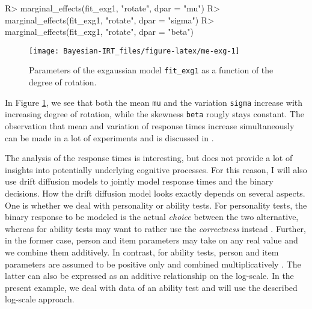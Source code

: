 \documentclass[jss]{jss}
\begin{document}
\begin{CodeChunk}

\begin{CodeInput}
R> marginal_effects(fit_exg1, "rotate", dpar = "mu")
R> marginal_effects(fit_exg1, "rotate", dpar = "sigma")
R> marginal_effects(fit_exg1, "rotate", dpar = "beta")
\end{CodeInput}
\end{CodeChunk}

\begin{CodeChunk}
\begin{figure}

{\centering \texttt{[image: Bayesian-IRT\_files/figure-latex/me-exg-1]} 

}

\caption[Parameters of the exgaussian model \texttt{fit\_exg1} as a function of the degree of rotation]{Parameters of the exgaussian model \texttt{fit\_exg1} as a function of the degree of rotation.}\label{fig:me-exg}
\end{figure}
\end{CodeChunk}

In Figure \ref{fig:me-exg}, we see that both the mean \texttt{mu} and
the variation \texttt{sigma} increase with increasing degree of
rotation, while the skewness \texttt{beta} rougly stays constant. The
observation that mean and variation of response times increase
simultaneously can be made in a lot of experiments and is discussed in
\citet{wagenmakers2007}.

The analysis of the response times is interesting, but does not provide
a lot of insights into potentially underlying cognitive processes. For
this reason, I will also use drift diffusion models to jointly model
response times and the binary decisions. How the drift diffusion model
looks exactly depends on several aspects. One is whether we deal with
personality or ability tests. For personality tests, the binary response
to be modeled is the actual \emph{choice} between the two alternative,
whereas for ability tests may want to rather use the \emph{correctness}
instead \citep{tuerlinckx2005, vandermaas2011}. Further, in the former
case, person and item parameters may take on any real value and we
combine them additively. In contrast, for ability tests, person and item
parameters are assumed to be positive only and combined multiplicatively
\citep{vandermaas2011}. The latter can also be expressed as an additive
relationship on the log-scale. In the present example, we deal with data
of an ability test and will use the described log-scale approach.
\end{document}
